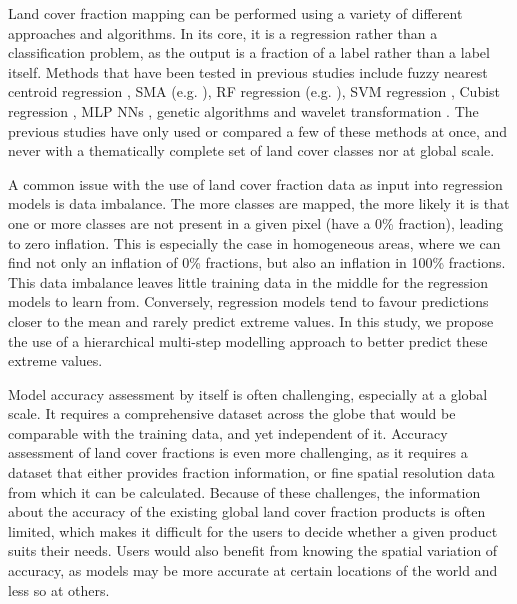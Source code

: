 \documentclass[review,authoryear,3p]{elsarticle}
\begin{document}
Land cover fraction mapping can be performed using a variety of different approaches and algorithms.
In its core, it is a regression rather than a classification problem, as the output is a fraction of a label rather than a label itself.
Methods that have been tested in previous studies include fuzzy nearest centroid regression \citep{zhang2001fullyfuzzy}, \ac{SMA} (e.g. \citealp{shimabukuro1991least, adams_classification_1995, hobbs2003linear, yang_landsat_2012}), \ac{RF} regression (e.g. \citealp{walton2008subpixelrf}), \gls{SVM} regression \citep{walton2008subpixelrf}, Cubist regression \citep{walton2008subpixelrf}, \gls{MLP} \glspl{NN} \citep{zhang2001fullyfuzzy}, genetic algorithms \citep{stavrakoudis_boosted_2011} and wavelet transformation \citep{uma_shankar_wavelet-fuzzy_2011}.
The previous studies have only used or compared a few of these methods at once, and never with a thematically complete set of land cover classes nor at global scale.

A common issue with the use of land cover fraction data as input into regression models is data imbalance.
The more classes are mapped, the more likely it is that one or more classes are not present in a given pixel (have a 0\% fraction), leading to zero inflation.
This is especially the case in homogeneous areas, where we can find not only an inflation of 0\% fractions, but also an inflation in 100\% fractions.
This data imbalance leaves little training data in the middle for the regression models to learn from.
Conversely, regression models tend to favour predictions closer to the mean and rarely predict extreme values.
In this study, we propose the use of a hierarchical multi-step modelling approach to better predict these extreme values.

Model accuracy assessment by itself is often challenging, especially at a global scale.
It requires a comprehensive dataset across the globe that would be comparable with the training data, and yet independent of it.
Accuracy assessment of land cover fractions is even more challenging, as it requires a dataset that either provides fraction information, or fine spatial resolution data from which it can be calculated.
Because of these challenges, the information about the accuracy of the existing global land cover fraction products is often limited, which makes it difficult for the users to decide whether a given product suits their needs.
Users would also benefit from knowing the spatial variation of accuracy, as models may be more accurate at certain locations of the world and less so at others.
\end{document}
